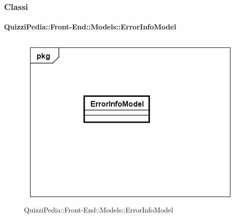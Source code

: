 	\subsubsection{Classi}
		\paragraph{QuizziPedia::Front-End::Models::ErrorInfoModel}
		
		\label{QuizziPedia::Front-End::Models::ErrorInfoModel}
		
		\begin{figure}[ht]
			\centering
			\includegraphics[scale=0.5,keepaspectratio]{UML/Classi/Front-End/QuizziPedia_Front-end_Models_ErrorInfoModel.png}
			\caption{QuizziPedia::Front-End::Models::ErrorInfoModel}
		\end{figure} \FloatBarrier
		

